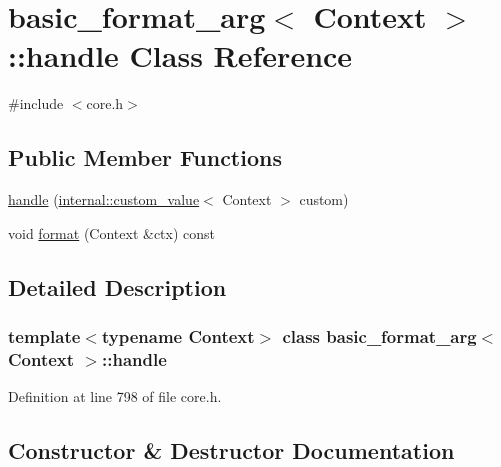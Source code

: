 \hypertarget{classbasic__format__arg_1_1handle}{}\section{basic\+\_\+format\+\_\+arg$<$ Context $>$\+:\+:handle Class Reference}
\label{classbasic__format__arg_1_1handle}


{\ttfamily \#include $<$core.\+h$>$}

\subsection*{Public Member Functions}
\begin{DoxyCompactItemize}
\item 
\hyperlink{classbasic__format__arg_1_1handle_ac5d4a1f899cac4ddbff7385e5aa5329b}{handle} (\hyperlink{structinternal_1_1custom__value}{internal\+::custom\+\_\+value}$<$ Context $>$ custom)
\item 
void \hyperlink{classbasic__format__arg_1_1handle_a3ab20a0f53159f281076487aad60e146}{format} (Context \&ctx) const
\end{DoxyCompactItemize}


\subsection{Detailed Description}
\subsubsection*{template$<$typename Context$>$\newline
class basic\+\_\+format\+\_\+arg$<$ Context $>$\+::handle}



Definition at line 798 of file core.\+h.



\subsection{Constructor \& Destructor Documentation}
\mbox{\label{classbasic__format__arg_1_1handle_ac5d4a1f899cac4ddbff7385e5aa5329b}} 
